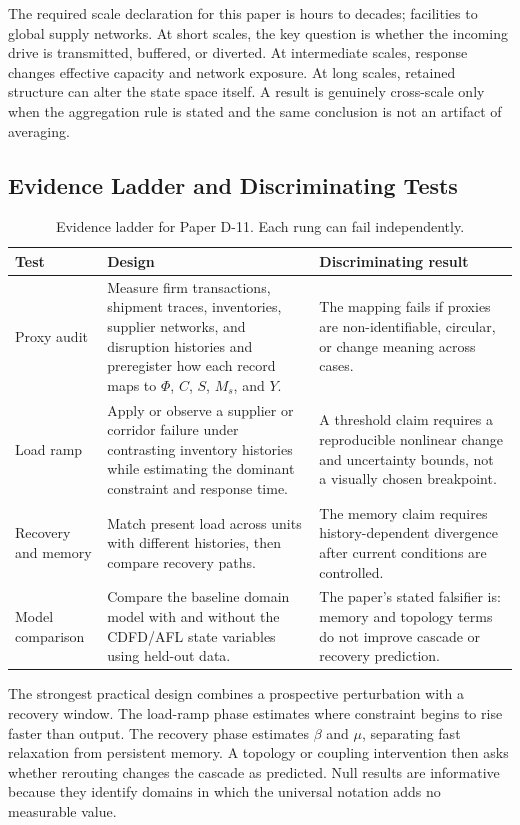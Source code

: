 \documentclass[11pt]{article}
\begin{document}
The required scale declaration for this paper is hours to decades; facilities to global supply networks. At short
scales, the key question is whether the incoming drive is transmitted,
buffered, or diverted. At intermediate scales, response changes effective
capacity and network exposure. At long scales, retained structure can alter the
state space itself. A result is genuinely cross-scale only when the aggregation
rule is stated and the same conclusion is not an artifact of averaging.

\subsection{Evidence Ladder and Discriminating Tests}

\begin{table}[htbp]
\centering
\small
\caption{Evidence ladder for Paper D-11. Each rung can fail independently.}
\begin{tabularx}{\textwidth}{|p{}|X|X|}
\hline
\textbf{Test} & \textbf{Design} & \textbf{Discriminating result} \\
\hline
Proxy audit & Measure firm transactions, shipment traces, inventories, supplier networks, and disruption histories and preregister how each record maps to $\Phi$, $C$, $S$, $M_s$, and $Y$. & The mapping fails if proxies are non-identifiable, circular, or change meaning across cases. \\
\hline
Load ramp & Apply or observe a supplier or corridor failure under contrasting inventory histories while estimating the dominant constraint and response time. & A threshold claim requires a reproducible nonlinear change and uncertainty bounds, not a visually chosen breakpoint. \\
\hline
Recovery and memory & Match present load across units with different histories, then compare recovery paths. & The memory claim requires history-dependent divergence after current conditions are controlled. \\
\hline
Model comparison & Compare the baseline domain model with and without the CDFD/AFL state variables using held-out data. & The paper's stated falsifier is: memory and topology terms do not improve cascade or recovery prediction. \\
\hline
\end{tabularx}
\end{table}

The strongest practical design combines a prospective perturbation with a
recovery window. The load-ramp phase estimates where constraint begins to rise
faster than output. The recovery phase estimates $\beta$ and $\mu$, separating
fast relaxation from persistent memory. A topology or coupling intervention
then asks whether rerouting changes the cascade as predicted. Null results are
informative because they identify domains in which the universal notation adds
no measurable value.
\end{document}
